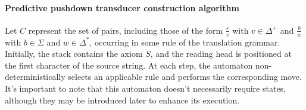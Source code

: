 \paragraph*{Predictive pushdown transducer construction algorithm}
Let $C$ represent the set of pairs, including those of the form $\frac{\varepsilon}{v}$ with $v \in \Delta^+$ and $\frac{b}{w}$ with $b \in \Sigma$ and $w \in \Delta^{\ast}$, occurring in some rule of the translation grammar. 
Initially, the stack contains the axiom $S$, and the reading head is positioned at the first character of the source string. 
At each step, the automaton non-deterministically selects an applicable rule and performs the corresponding move. 
It's important to note that this automaton doesn't necessarily require states, although they may be introduced later to enhance its execution.
\begin{table}[H]
    \centering
\end{table}
